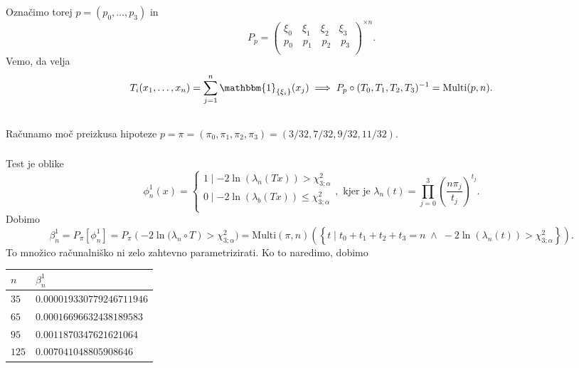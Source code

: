 \documentclass[ letterpaper, titlepage, fleqn]{article}
\newcommand{\ind}{\mathbbm{1}}
\begin{document}
\section{}
Označimo torej $p = (p_0, \dots, p_3)$ in
$$
P_p = \left(
\begin{array}{ll}
\xi_0 \quad \xi_1 \quad \xi_2 \quad \xi_3 \\
p_0 \quad p_1 \quad p_2 \quad p_3 \\
\end{array}
\right)^{\times n}.
$$
Vemo, da velja
$$T_i(x_1, \dots, x_n) = \sum_{j=1}^n \ind_{\{\xi_i\}}(x_j) \implies P_p \circ (T_0, T_1, T_2, T_{3})^{-1} = \text{Multi}(p,n).$$
\subsection{}
Računamo moč preizkusa hipoteze $p = \pi = (\pi_0, \pi_1, \pi_2, \pi_3) =  (3/32, 7/32, 9/32, 11/32)$.
\subsubsection{}
Test je oblike
$$
\phi^1_n(x)= 
\begin{cases}
1 \mid  -2 \ln(\lambda_n(Tx)) > \chi_{3; \alpha}^2 \\
0 \mid  -2 \ln(\lambda_b(Tx)) \leq \chi_{3; \alpha}^2 \\
\end{cases}, \text{ kjer je }
\lambda_n(t) = \prod_{j=0}^3 \left(\frac{n \pi_j}{t_j}\right)^{t_j}.
$$
Dobimo
\begin{equation*}
\beta^1_n = P_\pi[\phi^1_n] = P_\pi\left(-2\ln(\lambda_n \circ T\right) > \chi_{3;\alpha}^2) =
 \text{Multi}(\pi,n)\left(\left\{t\mid t_0 + t_1 + t_2 + t_3 = n \;\land\; -2\ln(\lambda_n(t)) > \chi_{3;\alpha}^2\right\}\right).
\end{equation*}
To množico računalniško ni zelo zahtevno parametrizirati. Ko to naredimo, dobimo
\begin{center}
\begin{tabular}{ l | l }
$n$ & $\beta^1_n$ \\
\hline
$35$ & $0.000019330779246711946$ \\
$65$ & $0.00016696632438189583$ \\
$95$ & $0.0011870347621621064$ \\
$125$ & $0.007041048805908646$ 
\end{tabular}
\end{center}
\end{document}
